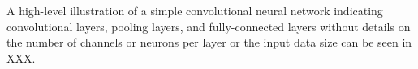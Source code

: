 A high-level illustration of a simple convolutional neural network indicating convolutional layers, pooling layers, and fully-connected layers without details on the number of channels or neurons per layer or the input data size can be seen in XXX.






\newpage


